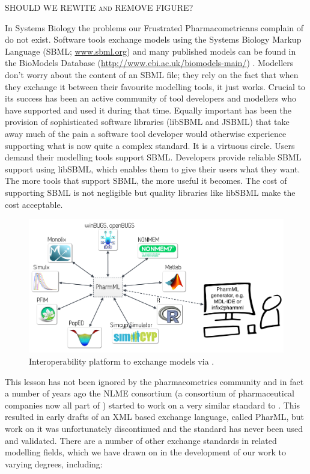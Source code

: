  {\color{red} \scshape{SHOULD WE REWITE and REMOVE FIGURE?}}
 

In Systems Biology the problems our Frustrated Pharmacometricans complain of do not exist. Software
tools exchange models using the Systems Biology Markup Language (SBML; \url{www.sbml.org})
\cite{SBML} and many published models can be found in the BioModels Database
(\url{http://www.ebi.ac.uk/biomodels-main/}) \cite{BioModels2010}. Modellers don't worry about the
content of an SBML file; they rely on the fact that when they exchange it between their favourite
modelling tools, it just works. Crucial to its success has been an active community of tool
developers and modellers who have supported and used it during
that time. Equally important has been the provision of sophisticated software libraries (libSBML
and JSBML) that take away much of the pain a software tool developer would otherwise experience
supporting what is now quite a complex standard. It is a virtuous circle. Users demand their
modelling tools support SBML\@. Developers provide reliable SBML support using libSBML, which
enables them to give their users what they want. The more tools that support SBML, the more useful
it becomes. The cost of supporting SBML is not negligible but quality libraries like libSBML make
the cost acceptable.

\begin{figure}[htb]
\centering
  \includegraphics[width=0.95\linewidth]{pics/platformDDMoRe.pdf}
 \caption{Interoperability platform to exchange models via \pharmml.}
 \label{fig:platformDDMoRe}
\end{figure}

This lesson has not been ignored by the pharmacometrics community and in fact a number of years
ago the NLME consortium (a consortium of pharmaceutical companies now all part of \ddmore) started
to work on a very similar standard to \pharmml. This resulted in early drafts of an XML based exchange
language, called PharML, but work on it was unfortunately discontinued and the standard has never been
used and validated. There are a number of other exchange standards in related modelling fields, which we
have drawn on in the development of our work to varying degrees, including:

